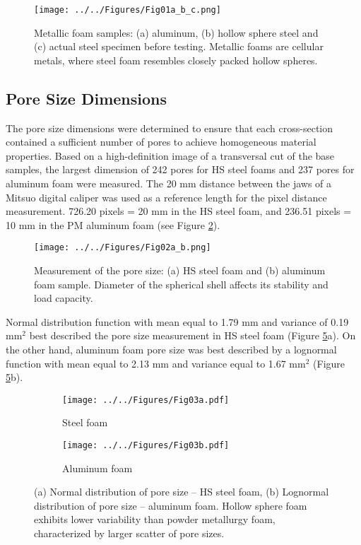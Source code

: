 \documentclass[review]{elsarticle}
\begin{document}
\begin{figure}[htbp]
	\begin{center}
		\texttt{[image: ../../Figures/Fig01a\_b\_c.png]}
		\caption{Metallic foam samples: (a) aluminum, (b) hollow sphere steel and (c) actual steel specimen before testing. Metallic foams are cellular metals, where steel foam resembles closely packed hollow spheres.}
		\label{Samples}
	\end{center}
\end{figure}

\subsection*{Pore Size Dimensions}

The pore size dimensions were determined to ensure that each cross-section contained a sufficient number of pores to achieve homogeneous material properties. Based on a high-definition image of a transversal cut of the base samples, the largest dimension of 242 pores for HS steel foams and 237 pores for aluminum foam were measured. The 20 mm distance between the jaws of a Mitsuo digital caliper was used as a reference length for the pixel distance measurement. 726.20 pixels = 20 mm in the HS steel foam, and 236.51 pixels = 10 mm in the PM aluminum foam (see Figure \ref{PoreMeas}).

\begin{figure}[htbp]
	\begin{center}
		\texttt{[image: ../../Figures/Fig02a\_b.png]}
		\caption{Measurement of the pore size: (a) HS steel foam and (b) aluminum foam sample. Diameter of the spherical shell affects its stability and load capacity.}
		\label{PoreMeas}
	\end{center}
\end{figure}

Normal distribution function with mean equal to 1.79 mm and variance of 0.19 mm$^2$ best described the pore size measurement in HS steel foam (Figure \ref{PoreSizeHistograms}a). On the other hand, aluminum foam pore size was best described by a lognormal function with mean equal to 2.13 mm and variance equal to 1.67 mm$^2$ (Figure \ref{PoreSizeHistograms}b).

\begin{figure}
	\centering
	\begin{subfigure}{.5\textwidth}
		\centering
		\texttt{[image: ../../Figures/Fig03a.pdf]}
		\caption{Steel foam}
		\label{fig3:sub1}
	\end{subfigure}%
	\begin{subfigure}{.5\textwidth}
		\centering
		\texttt{[image: ../../Figures/Fig03b.pdf]}
		\caption{Aluminum foam}
		\label{fig3:sub2}
	\end{subfigure}
	\caption{(a) Normal distribution of pore size – HS steel foam, (b) Lognormal distribution of pore size – aluminum foam. Hollow sphere foam exhibits lower variability than powder metallurgy foam, characterized by larger scatter of pore sizes.}
	\label{PoreSizeHistograms}
\end{figure}
\end{document}
